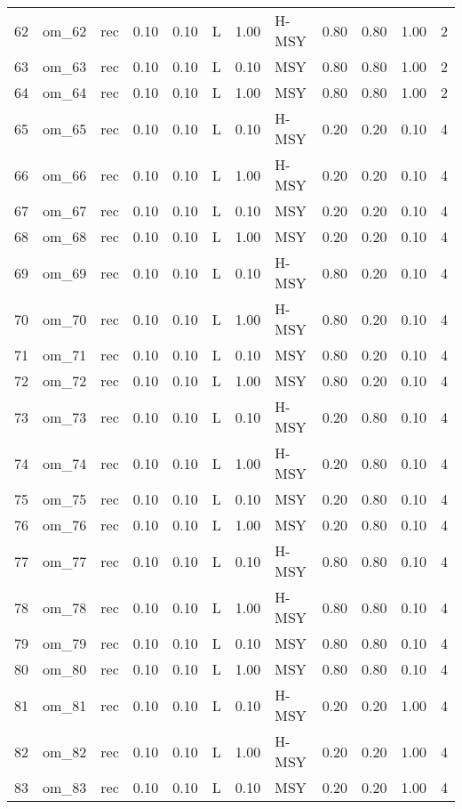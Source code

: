 \begin{table}[ht]
{\begin{tabular}{rllrrlrlrrrr}
  62 & om\_62 & rec & 0.10 & 0.10 & L & 1.00 & H-MSY & 0.80 & 0.80 & 1.00 &   2 \\ 
  63 & om\_63 & rec & 0.10 & 0.10 & L & 0.10 & MSY & 0.80 & 0.80 & 1.00 &   2 \\ 
  64 & om\_64 & rec & 0.10 & 0.10 & L & 1.00 & MSY & 0.80 & 0.80 & 1.00 &   2 \\ 
  65 & om\_65 & rec & 0.10 & 0.10 & L & 0.10 & H-MSY & 0.20 & 0.20 & 0.10 &   4 \\ 
  66 & om\_66 & rec & 0.10 & 0.10 & L & 1.00 & H-MSY & 0.20 & 0.20 & 0.10 &   4 \\ 
  67 & om\_67 & rec & 0.10 & 0.10 & L & 0.10 & MSY & 0.20 & 0.20 & 0.10 &   4 \\ 
  68 & om\_68 & rec & 0.10 & 0.10 & L & 1.00 & MSY & 0.20 & 0.20 & 0.10 &   4 \\ 
  69 & om\_69 & rec & 0.10 & 0.10 & L & 0.10 & H-MSY & 0.80 & 0.20 & 0.10 &   4 \\ 
  70 & om\_70 & rec & 0.10 & 0.10 & L & 1.00 & H-MSY & 0.80 & 0.20 & 0.10 &   4 \\ 
  71 & om\_71 & rec & 0.10 & 0.10 & L & 0.10 & MSY & 0.80 & 0.20 & 0.10 &   4 \\ 
  72 & om\_72 & rec & 0.10 & 0.10 & L & 1.00 & MSY & 0.80 & 0.20 & 0.10 &   4 \\ 
  73 & om\_73 & rec & 0.10 & 0.10 & L & 0.10 & H-MSY & 0.20 & 0.80 & 0.10 &   4 \\ 
  74 & om\_74 & rec & 0.10 & 0.10 & L & 1.00 & H-MSY & 0.20 & 0.80 & 0.10 &   4 \\ 
  75 & om\_75 & rec & 0.10 & 0.10 & L & 0.10 & MSY & 0.20 & 0.80 & 0.10 &   4 \\ 
  76 & om\_76 & rec & 0.10 & 0.10 & L & 1.00 & MSY & 0.20 & 0.80 & 0.10 &   4 \\ 
  77 & om\_77 & rec & 0.10 & 0.10 & L & 0.10 & H-MSY & 0.80 & 0.80 & 0.10 &   4 \\ 
  78 & om\_78 & rec & 0.10 & 0.10 & L & 1.00 & H-MSY & 0.80 & 0.80 & 0.10 &   4 \\ 
  79 & om\_79 & rec & 0.10 & 0.10 & L & 0.10 & MSY & 0.80 & 0.80 & 0.10 &   4 \\ 
  80 & om\_80 & rec & 0.10 & 0.10 & L & 1.00 & MSY & 0.80 & 0.80 & 0.10 &   4 \\ 
  81 & om\_81 & rec & 0.10 & 0.10 & L & 0.10 & H-MSY & 0.20 & 0.20 & 1.00 &   4 \\ 
  82 & om\_82 & rec & 0.10 & 0.10 & L & 1.00 & H-MSY & 0.20 & 0.20 & 1.00 &   4 \\ 
  83 & om\_83 & rec & 0.10 & 0.10 & L & 0.10 & MSY & 0.20 & 0.20 & 1.00 &   4 \\ 

\end{tabular}}
\end{table}
